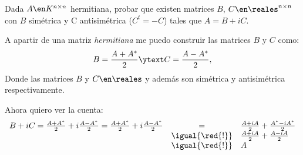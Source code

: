\begin{enunciado}{\ejercicio}
  Dada $A \en K^{n \times n}$ hermitiana, probar que existen matrices $B$, $C \en \reales^{n \times n}$ con $B$ simétrica y
  C antisimétrica ($C^t = -C$) tales que $A = B + iC$.
\end{enunciado}

A apartir de una matriz \textit{hermitiana} me puedo construir las matrices $B$ y $C$ como:
$$
  B = \frac{A + A^*}{2}
  \ytext
  C = \frac{A - A^*}{2},
$$
Donde las matrices $B$ y $C \en \reales$ y además son simétrica y antisimétrica respectivamente.

Ahora quiero ver la cuenta:
$$
  \begin{array}{rcl}
    B + iC
    =
    \frac{A + A^*}{2} + i \frac{A - A^*}{2}
    =
    \frac{A + A^*}{2} + i \frac{A - A^*}{2}
     & =               &
    \frac{A + iA}{2} +  \frac{A^* -i A^*}{2} \\
     & \igual{\red{!}} &
    \frac{A + iA}{2} +  \frac{A -i A}{2}     \\
     & \igual{\red{!}} &
    A
  \end{array}
$$

\begin{aportes}
  \item {}
\end{aportes}
